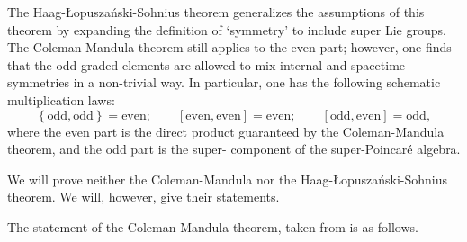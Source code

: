 \documentclass[a4paper,10pt]{scrreprt}
\theoremstyle{definition}
\theoremstyle{plain}
\theoremstyle{remark}
\begin{document}
The Haag-{\L}opusza{\'n}ski-Sohnius theorem generalizes the assumptions of this theorem by expanding the definition of `symmetry' to include super Lie groups. The Coleman-Mandula theorem still applies to the even part; however, one finds that the odd-graded elements are allowed to mix internal and spacetime symmetries in a non-trivial way. In particular, one has the following schematic multiplication laws:
\begin{equation*}
  \left\{ \text{odd}, \text{odd} \right\} = \text{even};\qquad \left[ \text{even}, \text{even} \right] = \text{even};\qquad \left[ \text{odd}, \text{even} \right] = \text{odd},
\end{equation*}
where the even part is the direct product guaranteed by the Coleman-Mandula theorem, and the odd part is the super- component of the super-Poincar{\'e} algebra.

We will prove neither the Coleman-Mandula nor the Haag-{\L}opusza{\'n}ski-Sohnius theorem. We will, however, give their statements.

The statement of the Coleman-Mandula theorem, taken from \cite{muller-kirsen-wiedmann-intro-susy} is as follows.
\end{document}
